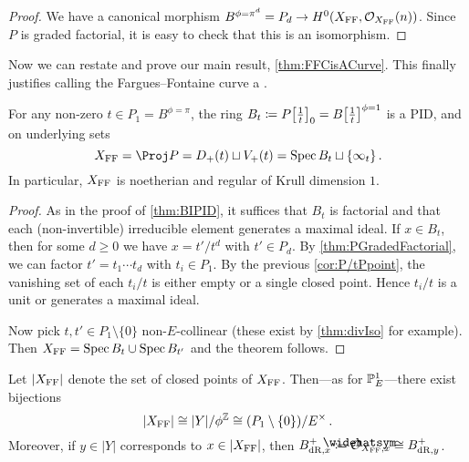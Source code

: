 \begin{proof}
	We have a canonical morphism $B^{\phi=\pi^d}=P_d\morphism H^0(X_\FFC,\Oo_{X_\FFC}(n))$. Since $P$ is graded factorial, it is easy to check that this is an isomorphism.
\end{proof}
Now we can restate and prove our main result, \cref{thm:FFCisACurve}. This finally justifies calling the Fargues--Fontaine curve a .
\begin{mainthm}\label{thm:FFCisACurveII}
	For any non-zero $t\in P_1=B^{\phi=\pi}$, the ring $B_t\coloneqq P\localize{t}_0=B\localize{t}^{\phi=1}$ is a PID, and on underlying sets
	\begin{equation*}
		X_\FFC=\Proj P=D_+(t)\sqcup V_+(t)=\Spec B_t\sqcup \{\infty_t\}\,.
	\end{equation*}
	In particular, $X_{\mathrm{FF}}$ is noetherian and regular of Krull dimension $1$.
\end{mainthm}
\begin{proof}
	As in the proof of \cref{thm:BIPID}, it suffices that $B_t$ is factorial and that each (non-invertible) irreducible element generates a maximal ideal. If $x\in B_t$, then for some $d\geq 0$ we have $x=t'/t^d$ with $t'\in P_d$. By \cref{thm:PGradedFactorial}, we can factor $t'=t_1\dotsm t_d$ with $t_i\in P_1$. By the previous \cref{cor:P/tPpoint}, the vanishing set of each $t_i/t$ is either empty or a single closed point. Hence $t_i/t$ is a unit or generates a maximal ideal.
	
	Now pick $t,t'\in P_1\setminus \{0\}$ non-$E$-collinear (these exist by \cref{thm:divIso} for example). Then $X_{\mathrm{FF}}=\operatorname{Spec} B_t\cup \operatorname{Spec} B_{t'}$ and the theorem follows.
\end{proof}
\begin{lem}\label{lem:BdRx}
	Let $|X_{\mathrm{FF}}|$ denote the set of closed points of $X_{\mathrm{FF}}$. Then---as for $\mathbb{P}_E^1$---there exist bijections
	\begin{equation*}
		|X_\FFC|\cong |Y|/\phi^\IZ \cong (P_1\setminus\{0\})/E^\times\,.
	\end{equation*}
	Moreover, if $y\in |Y|$ corresponds to $x\in |X_{\mathrm{FF}}|$, then $B_{\dR,x}^+\coloneqq \roof{\Oo}_{X_\FFC,x}\cong B_{\dR,y}^+$.
\end{lem}
